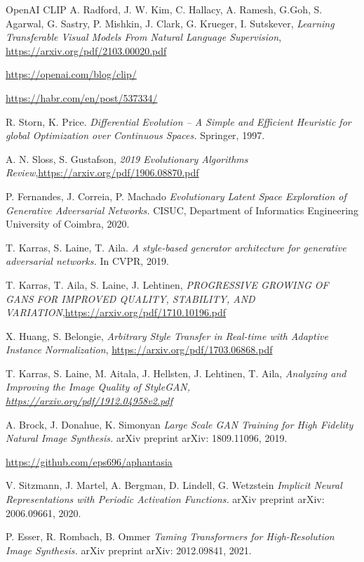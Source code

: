 \documentclass[12pt,a4paper,openany]{book}
\begin{document}
\begin{thebibliography}{a,b,c}
 OpenAI CLIP A. Radford, J. W. Kim, C. Hallacy, A. Ramesh, G.Goh, S. Agarwal, G. Sastry, P. Mishkin, J. Clark, G. Krueger, I. Sutskever, {\it Learning Transferable Visual Models From Natural Language Supervision}, \url{https://arxiv.org/pdf/2103.00020.pdf}

 \url{https://openai.com/blog/clip/}

 \url{https://habr.com/en/post/537334/}

 R. Storn, K. Price. {\it Differential Evolution – A Simple and Efficient Heuristic for global Optimization over Continuous Spaces.} Springer, 1997.

 A. N. Sloss, S. Gustafson, {\it 2019 Evolutionary Algorithms Review},\url{https://arxiv.org/pdf/1906.08870.pdf}

 P. Fernandes, J. Correia, P. Machado {\it Evolutionary Latent Space Exploration of Generative Adversarial Networks.} CISUC, Department of Informatics Engineering University of Coimbra, 2020.

 T. Karras, S. Laine, T. Aila. {\it A style-based generator architecture for generative adversarial networks.} In CVPR, 2019.

 T. Karras,  T. Aila, S. Laine, J. Lehtinen, {\it PROGRESSIVE GROWING OF GANS FOR IMPROVED
QUALITY, STABILITY, AND VARIATION},\url{https://arxiv.org/pdf/1710.10196.pdf}

 X. Huang, S. Belongie, {\it Arbitrary Style Transfer in Real-time with Adaptive Instance Normalization}, \url{https://arxiv.org/pdf/1703.06868.pdf}

 T. Karras, S. Laine, M. Aitala, J. Hellsten, J. Lehtinen, T. Aila, \it{Analyzing and Improving the Image Quality of StyleGAN}, \url{https://arxiv.org/pdf/1912.04958v2.pdf}

 A. Brock, J. Donahue, K. Simonyan {\it Large Scale GAN Training for High Fidelity Natural Image Synthesis.} arXiv preprint arXiv: 1809.11096, 2019.

 \url{https://github.com/eps696/aphantasia}

 V. Sitzmann, J. Martel, A. Bergman, D. Lindell, G. Wetzstein {\it Implicit Neural Representations with Periodic Activation Functions.} arXiv preprint arXiv: 2006.09661, 2020.

 P. Esser, R. Rombach, B. Ommer {\it Taming Transformers for High-Resolution Image Synthesis.} arXiv preprint arXiv: 2012.09841, 2021.


\end{thebibliography}
\end{document}
